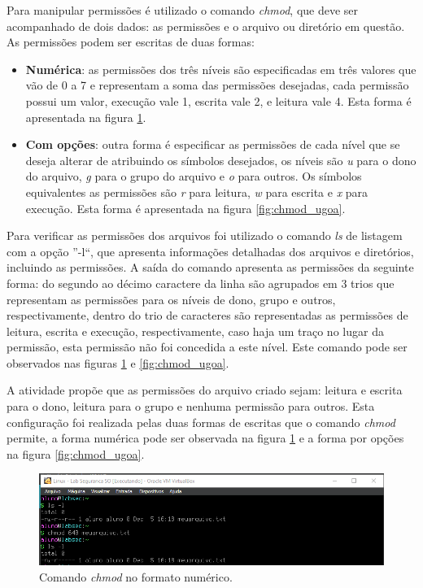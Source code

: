 \documentclass[
	12pt,				%
	oneside,   	        %
	a4paper,			%
	english,			%
	french,				%
	spanish,			%
	brazil,				%
	]{pacotes/abntex2}
\begin{document}
Para manipular permissões é utilizado o comando \textit{chmod}, que deve ser acompanhado de dois dados: as permissões e o arquivo ou diretório em questão. As permissões podem ser escritas de duas formas:
\begin{itemize}
    \item \textbf{Numérica}: as permissões dos três níveis são especificadas em três valores que vão de 0 a 7 e representam a soma das permissões desejadas, cada permissão possui um valor, execução vale 1, escrita vale 2, e leitura vale 4. Esta forma é apresentada na figura \ref{fig:chmod_num}.
    \item \textbf{Com opções}: outra forma é especificar as permissões de cada nível que se deseja alterar de atribuindo os símbolos desejados, os níveis são \textit{u} para o dono do arquivo, \textit{g} para o grupo do arquivo e \textit{o} para outros. Os símbolos equivalentes as permissões são \textit{r} para leitura, \textit{w} para escrita e \textit{x} para execução. Esta forma é apresentada na figura \ref{fig:chmod_ugoa}.
\end{itemize}

Para verificar as permissões dos arquivos foi utilizado o comando \textit{ls} de listagem com a opção ''-l``, que apresenta informações detalhadas dos arquivos e diretórios, incluindo as permissões. A saída do comando apresenta as permissões da seguinte forma: do segundo ao décimo caractere da linha são agrupados em 3 trios que representam as permissões para os níveis de dono, grupo e outros, respectivamente, dentro do trio de caracteres são representadas as permissões de leitura, escrita e execução, respectivamente, caso haja um traço no lugar da permissão, esta permissão não foi concedida a este nível. Este comando pode ser observados nas figuras \ref{fig:chmod_num} e \ref{fig:chmod_ugoa}.

A atividade propõe que as permissões do arquivo criado sejam: leitura e escrita para o dono, leitura para o grupo e nenhuma permissão para outros. Esta configuração foi realizada pelas duas formas de escritas que o comando \textit{chmod} permite, a forma numérica pode ser observada na figura \ref{fig:chmod_num} e a forma por opções na figura \ref{fig:chmod_ugoa}.

\begin{figure}[H]
  \centering
  \includegraphics[scale=0.7]{figuras/chmod_num.png}
  \caption{Comando \textit{chmod} no formato numérico.}
  \label{fig:chmod_num}
\end{figure}
\end{document}
